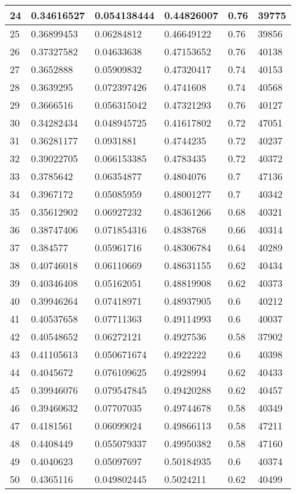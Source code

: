 \begin{longtable}{|l|l|l|l|l|l|}
24 & 0.34616527 & 0.054138444 & 0.44826007 & 0.76 & 39775 \\ \hline 
25 & 0.36899453 & 0.06284812 & 0.46649122 & 0.76 & 39856 \\ \hline 
26 & 0.37327582 & 0.04633638 & 0.47153652 & 0.76 & 40138 \\ \hline 
27 & 0.3652888 & 0.05909832 & 0.47320417 & 0.74 & 40153 \\ \hline 
28 & 0.3639295 & 0.072397426 & 0.4741608 & 0.74 & 40568 \\ \hline 
29 & 0.3666516 & 0.056315042 & 0.47321293 & 0.76 & 40127 \\ \hline 
30 & 0.34282434 & 0.048945725 & 0.41617802 & 0.72 & 47051 \\ \hline 
31 & 0.36281177 & 0.0931881 & 0.4744235 & 0.72 & 40237 \\ \hline 
32 & 0.39022705 & 0.066153385 & 0.4783435 & 0.72 & 40372 \\ \hline 
33 & 0.3785642 & 0.06354877 & 0.4804076 & 0.7 & 47136 \\ \hline 
34 & 0.3967172 & 0.05085959 & 0.48001277 & 0.7 & 40342 \\ \hline 
35 & 0.35612902 & 0.06927232 & 0.48361266 & 0.68 & 40321 \\ \hline 
36 & 0.38747406 & 0.071854316 & 0.4838768 & 0.66 & 40314 \\ \hline 
37 & 0.384577 & 0.05961716 & 0.48306784 & 0.64 & 40289 \\ \hline 
38 & 0.40746018 & 0.06110669 & 0.48631155 & 0.62 & 40434 \\ \hline 
39 & 0.40346408 & 0.05162051 & 0.48819908 & 0.62 & 40373 \\ \hline 
40 & 0.39946264 & 0.07418971 & 0.48937905 & 0.6 & 40212 \\ \hline 
41 & 0.40537658 & 0.07711363 & 0.49114993 & 0.6 & 40037 \\ \hline 
42 & 0.40548652 & 0.06272121 & 0.4927536 & 0.58 & 37902 \\ \hline 
43 & 0.41105613 & 0.050671674 & 0.4922222 & 0.6 & 40398 \\ \hline 
44 & 0.4045672 & 0.076109625 & 0.4928994 & 0.62 & 40433 \\ \hline 
45 & 0.39946076 & 0.079547845 & 0.49420288 & 0.62 & 40457 \\ \hline 
46 & 0.39460632 & 0.07707035 & 0.49744678 & 0.58 & 40349 \\ \hline 
47 & 0.4181561 & 0.06099024 & 0.49866113 & 0.58 & 47211 \\ \hline 
48 & 0.4408449 & 0.055079337 & 0.49950382 & 0.58 & 47160 \\ \hline 
49 & 0.4040623 & 0.05097697 & 0.50184935 & 0.6 & 40374 \\ \hline 
50 & 0.4365116 & 0.049802445 & 0.5024211 & 0.62 & 40499 \\ \hline 
\end{longtable}
